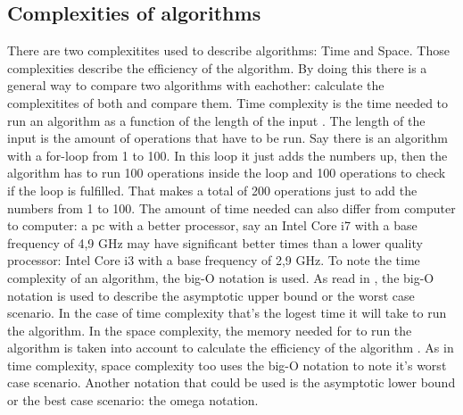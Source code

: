 \subsection{Complexities of algorithms}
\label{subsec:Complexities}
There are two complexitites used to describe algorithms: Time and Space. Those complexities describe the efficiency of the algorithm. By doing this there is a general way to compare two algorithms with eachother: calculate the complexitites of both and compare them.
Time complexity is the time needed to run an algorithm as a function of the length of the input \autocite{Timecomp}. The length of the input is the amount of operations that have to be run. Say there is an algorithm with a for-loop from 1 to 100.
In this loop it just adds the numbers up, then the algorithm has to run 100 operations inside the loop and 100 operations to check if the loop is fulfilled. That makes a total of 200 operations just to add the numbers from 1 to 100.
The amount of time needed can also differ from computer to computer: a pc with a better processor, say an Intel Core i7 with a base frequency of 4,9 GHz may have significant better times than a lower quality processor: Intel Core i3 with a base frequency of 2,9 GHz.
To note the time complexity of an algorithm, the big-O notation is used. As read in \textcite{Hidary_2019}, the big-O notation is used to describe the asymptotic upper bound or the worst case scenario. In the case of time complexity that's the logest time it will take to run the algorithm.
In the space complexity, the memory needed for to run the algorithm is taken into account to calculate the efficiency of the algorithm \autocite{Abhishek2021Ruimte}. As in time complexity, space complexity too uses the big-O notation to note it's worst case scenario. Another notation that could be used is the asymptotic lower bound or the best case scenario: the omega notation.

